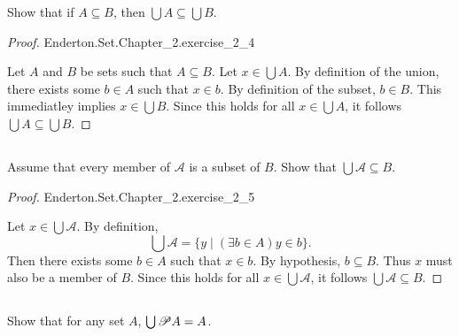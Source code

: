\documentclass{report}
\begin{document}
Show that if $A \subseteq B$, then $\bigcup A \subseteq \bigcup B$.

\begin{proof}

    {Enderton.Set.Chapter\_2.exercise\_2\_4}

  Let $A$ and $B$ be sets such that $A \subseteq B$.
  Let $x \in \bigcup A$.
  By definition of the union, there exists some $b \in A$ such that $x \in b$.
  By definition of the subset, $b \in B$.
  This immediatley implies $x \in \bigcup B$.
  Since this holds for all $x \in \bigcup A$, it follows
    $\bigcup A \subseteq \bigcup B$.

\end{proof}

\subsection{}%
\label{sub:exercise-2.5}

Assume that every member of $\mathscr{A}$ is a subset of $B$.
Show that $\bigcup \mathscr{A} \subseteq B$.

\begin{proof}

    {Enderton.Set.Chapter\_2.exercise\_2\_5}

  Let $x \in \bigcup \mathscr{A}$.
  By definition,
    $$\bigcup \mathscr{A} = \{ y \mid (\exists b \in A)y \in b \}.$$
  Then there exists some $b \in A$ such that $x \in b$.
  By hypothesis, $b \subseteq B$.
  Thus $x$ must also be a member of $B$.
  Since this holds for all $x \in \bigcup \mathscr{A}$, it follows
    $\bigcup \mathscr{A} \subseteq B$.

\end{proof}

\subsection{}%
\label{sub:exercise-2.6a}

Show that for any set $A$, $\bigcup \mathscr{P}A = A$.
\end{document}
